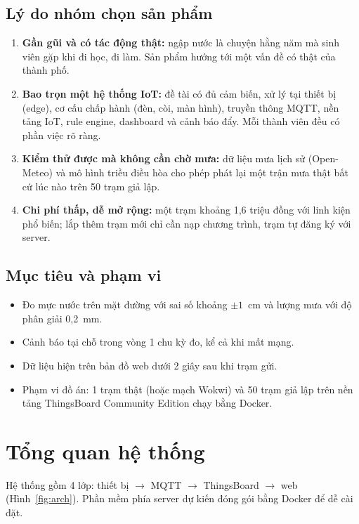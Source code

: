 \documentclass[12pt,a4paper]{article}
\begin{document}
\subsection{Lý do nhóm chọn sản phẩm}

\begin{enumerate}
  \item \textbf{Gần gũi và có tác động thật:} ngập nước là chuyện hằng năm mà sinh viên gặp khi đi học, đi làm. Sản phẩm hướng tới một vấn đề có thật của thành phố.
  \item \textbf{Bao trọn một hệ thống IoT:} đề tài có đủ cảm biến, xử lý tại thiết bị (edge), cơ cấu chấp hành (đèn, còi, màn hình), truyền thông MQTT, nền tảng IoT, rule engine, dashboard và cảnh báo đẩy. Mỗi thành viên đều có phần việc rõ ràng.
  \item \textbf{Kiểm thử được mà không cần chờ mưa:} dữ liệu mưa lịch sử (Open-Meteo) và mô hình triều điều hòa cho phép phát lại một trận mưa thật bất cứ lúc nào trên 50 trạm giả lập.
  \item \textbf{Chi phí thấp, dễ mở rộng:} một trạm khoảng 1,6 triệu đồng với linh kiện phổ biến; lắp thêm trạm mới chỉ cần nạp chương trình, trạm tự đăng ký với server.
\end{enumerate}

\subsection{Mục tiêu và phạm vi}

\begin{itemize}
  \item Đo mực nước trên mặt đường với sai số khoảng $\pm 1$~cm và lượng mưa với độ phân giải 0,2~mm.
  \item Cảnh báo tại chỗ trong vòng 1 chu kỳ đo, kể cả khi mất mạng.
  \item Dữ liệu hiện trên bản đồ web dưới 2 giây sau khi trạm gửi.
  \item Phạm vi đồ án: 1 trạm thật (hoặc mạch Wokwi) và 50 trạm giả lập trên nền tảng ThingsBoard Community Edition chạy bằng Docker.
\end{itemize}

\section{Tổng quan hệ thống}

Hệ thống gồm 4 lớp: thiết bị $\rightarrow$ MQTT $\rightarrow$ ThingsBoard $\rightarrow$ web (Hình~\ref{fig:arch}). Phần mềm phía server dự kiến đóng gói bằng Docker để dễ cài đặt.
\end{document}
